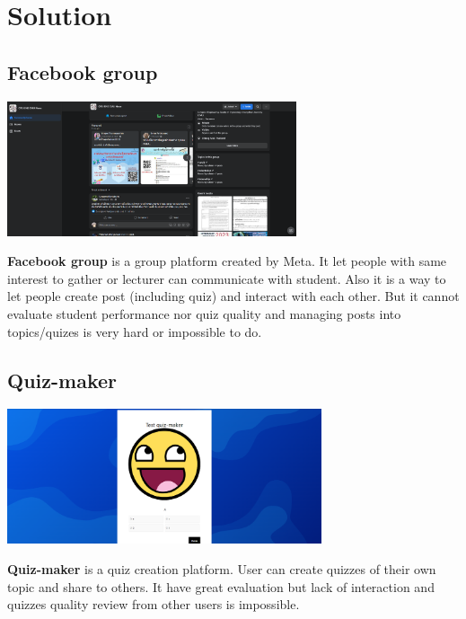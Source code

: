 \documentclass[a4paper, 12pt]{report}
\begin{document}
    \pagebreak
    \section*{Solution}

    \subsection*{Facebook group}
    \begin{center}
        \includegraphics[height=150px]{facebook_group.png}
    \end{center}

    \textbf{Facebook group} is a group platform created by Meta. It let people with same interest to gather or lecturer can communicate with student. Also it is a way to let people create post (including quiz) and interact with each other. But it cannot evaluate student performance nor quiz quality and managing posts into topics/quizes is very hard or impossible to do.

    \subsection*{Quiz-maker}
    \begin{center}
        \includegraphics[height=150px]{quiz-maker.png}
    \end{center}
    
    \textbf{Quiz-maker} is a quiz creation platform. User can create quizzes of their own topic and share to others. It have great evaluation but lack of interaction and quizzes quality review from other users is impossible.
    
\end{document}
